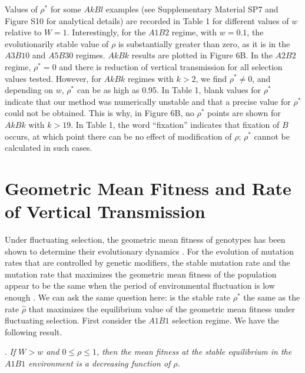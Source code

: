 \documentclass[9pt,twocolumn,twoside,lineno]{pnas-new}
\begin{document}
Values of $\rho^*$ for some $AkBl$ examples (see Supplementary Material SP7 and  Figure S10 for analytical details) are recorded in Table 1 for different values of $w$ relative to $W=1$. Interestingly, for the $A1B2$ regime, with $w=0.1$, the evolutionarily stable value of $\rho$ is substantially greater than zero, as it is in the $A3B10$ and $A5B30$ regimes.
$AkBk$ results are plotted in Figure 6B. In the $A2B2$ regime, $\rho^* =0$ and there is reduction of vertical transmission for all selection values tested. However, for $AkBk$ regimes with $k>2$, we find $\rho^*\ne 0$, and depending on $w$, $\rho^*$ can be as high as 0.95. In Table 1, blank values for $\rho^*$ indicate that our method was numerically unstable  and that a precise value for $\rho^*$ could not be obtained. This is why, in Figure 6B, no $\rho^*$ points are shown for $AkBk$ with $k>19$. In Table 1, the word ``fixation'' indicates that fixation of $B$ occurs, at which point there can be no effect of modification of $\rho$; $\rho^*$ cannot be calculated in such cases.

\section{Geometric Mean Fitness and Rate of Vertical Transmission}

Under fluctuating selection, the geometric mean fitness of genotypes has been shown to determine their evolutionary dynamics \cite{haldane1963polymorphism,karlin1974random,wakano2004evolution}. For the evolution of mutation rates that are controlled by genetic modifiers, the stable mutation rate and the mutation rate that maximizes the geometric mean fitness of the population appear to be the same when the period of environmental fluctuation is low enough \cite{liberman2011evolution}. We can ask the same question here: is the stable rate $\rho^*$ the same as the rate $\hat\rho$ that maximizes the equilibrium value of the geometric mean fitness under fluctuating selection. First consider the $A1B1$ selection regime. We have the following result.
\medskip

. {\sl If $W>w$ and $0\le\rho\le 1$, then the mean fitness at the stable equilibrium in the $A1B1$ environment is a decreasing function of $\rho$.}\par
\medskip
\end{document}
